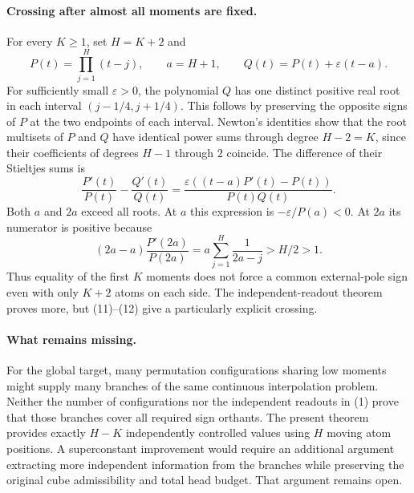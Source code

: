 \documentclass[11pt]{article}
\begin{document}
\paragraph{Crossing after almost all moments are fixed.}
For every $K\geq1$, set $H=K+2$ and
\[
 P(t)=\prod_{j=1}^H(t-j),\qquad a=H+1,
 \qquad Q(t)=P(t)+\varepsilon(t-a).
 \tag{11}
\]
For sufficiently small $\varepsilon>0$, the polynomial $Q$ has
one distinct positive real root in each interval
$(j-1/4,j+1/4)$. This follows by preserving the opposite signs
of $P$ at the two endpoints of each interval. Newton's identities
show that the root multisets of $P$ and $Q$ have identical power
sums through degree $H-2=K$, since their coefficients of degrees
$H-1$ through $2$ coincide.
The difference of their Stieltjes sums is
\[
 \frac{P'(t)}{P(t)}-\frac{Q'(t)}{Q(t)}
 =\frac{\varepsilon((t-a)P'(t)-P(t))}{P(t)Q(t)}.
 \tag{12}
\]
Both $a$ and $2a$ exceed all roots. At $a$ this expression is
$-\varepsilon/P(a)<0$. At $2a$ its numerator is positive because
\[
 (2a-a)\frac{P'(2a)}{P(2a)}
 =a\sum_{j=1}^H\frac1{2a-j}>H/2>1.
\]
Thus equality of the first $K$ moments does not force a common
external-pole sign even with only $K+2$ atoms on each side.
The independent-readout theorem proves more, but (11)--(12)
give a particularly explicit crossing.

\paragraph{What remains missing.}
For the global target, many permutation configurations sharing
low moments might supply many branches of the same continuous
interpolation problem. Neither the number of configurations nor
the independent readouts in (1) prove that those branches cover
all required sign orthants. The present theorem provides exactly
$H-K$ independently controlled values using $H$ moving atom
positions. A superconstant improvement would require an additional
argument extracting more independent information from the branches
while preserving the original cube admissibility and total head
budget. That argument remains open.
\end{document}
